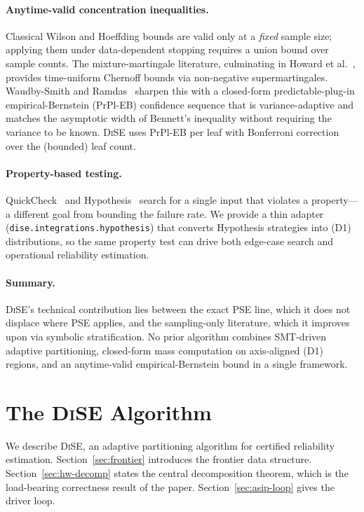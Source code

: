 \documentclass[runningheads]{llncs}
\providecommand{\Cref}[1]{Section~\ref{#1}}
\newcommand{\toolname}{\textsc{DiSE}}
\newcommand{\code}[1]{\texttt{#1}}
\begin{document}
\paragraph{Anytime-valid concentration inequalities.}
Classical Wilson and Hoeffding bounds are valid only at a
\emph{fixed} sample size; applying them under data-dependent stopping
requires a union bound over sample counts.  The mixture-martingale
literature, culminating in Howard et al.~\cite{howard2021time},
provides time-uniform Chernoff bounds via non-negative
supermartingales.  Waudby-Smith and
Ramdas~\cite{waudbysmith2024betting} sharpen this with a closed-form
predictable-plug-in empirical-Bernstein (PrPl-EB) confidence sequence
that is variance-adaptive and matches the asymptotic width of
Bennett's inequality without requiring the variance to be known.
\toolname{} uses PrPl-EB per leaf with Bonferroni correction over the
(bounded) leaf count.

\paragraph{Property-based testing.}
QuickCheck~\cite{claessen2000quickcheck} and
Hypothesis~\cite{maciver2019hypothesis} search for a single input that
violates a property---a different goal from bounding the failure rate.
We provide a thin adapter (\code{dise.integrations.hypothesis}) that
converts Hypothesis strategies into (D1) distributions, so the same
property test can drive both edge-case search and operational
reliability estimation.

\paragraph{Summary.}
\toolname{}'s technical contribution lies between the exact PSE line,
which it does not displace where PSE applies, and the sampling-only
literature, which it improves upon via symbolic stratification.  No
prior algorithm combines SMT-driven adaptive partitioning, closed-form
mass computation on axis-aligned (D1) regions, and an anytime-valid
empirical-Bernstein bound in a single framework.

\section{The \toolname{} Algorithm}\label{sec:algorithm}

We describe \toolname{}, an adaptive partitioning algorithm for
certified reliability estimation.  \Cref{sec:frontier} introduces the frontier data
structure.  \Cref{sec:hw-decomp} states the central decomposition
theorem, which is the load-bearing correctness result of the paper.
\Cref{sec:asip-loop} gives the driver loop.
\end{document}
